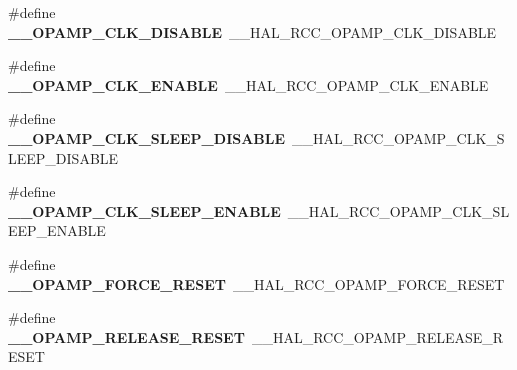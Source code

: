 \begin{DoxyCompactItemize}
\item 
\hypertarget{group___h_a_l___r_c_c___aliased_ga57437cfe118604cf72d55a9f85461322}{\#define {\bfseries \-\_\-\-\_\-\-O\-P\-A\-M\-P\-\_\-\-C\-L\-K\-\_\-\-D\-I\-S\-A\-B\-L\-E}~\-\_\-\-\_\-\-H\-A\-L\-\_\-\-R\-C\-C\-\_\-\-O\-P\-A\-M\-P\-\_\-\-C\-L\-K\-\_\-\-D\-I\-S\-A\-B\-L\-E}\label{group___h_a_l___r_c_c___aliased_ga57437cfe118604cf72d55a9f85461322}

\item 
\hypertarget{group___h_a_l___r_c_c___aliased_ga35ce4b63f0079be9008cdd6466ba22b7}{\#define {\bfseries \-\_\-\-\_\-\-O\-P\-A\-M\-P\-\_\-\-C\-L\-K\-\_\-\-E\-N\-A\-B\-L\-E}~\-\_\-\-\_\-\-H\-A\-L\-\_\-\-R\-C\-C\-\_\-\-O\-P\-A\-M\-P\-\_\-\-C\-L\-K\-\_\-\-E\-N\-A\-B\-L\-E}\label{group___h_a_l___r_c_c___aliased_ga35ce4b63f0079be9008cdd6466ba22b7}

\item 
\hypertarget{group___h_a_l___r_c_c___aliased_gad7e06b8ade3d2d9956bf8ec61b5df71f}{\#define {\bfseries \-\_\-\-\_\-\-O\-P\-A\-M\-P\-\_\-\-C\-L\-K\-\_\-\-S\-L\-E\-E\-P\-\_\-\-D\-I\-S\-A\-B\-L\-E}~\-\_\-\-\_\-\-H\-A\-L\-\_\-\-R\-C\-C\-\_\-\-O\-P\-A\-M\-P\-\_\-\-C\-L\-K\-\_\-\-S\-L\-E\-E\-P\-\_\-\-D\-I\-S\-A\-B\-L\-E}\label{group___h_a_l___r_c_c___aliased_gad7e06b8ade3d2d9956bf8ec61b5df71f}

\item 
\hypertarget{group___h_a_l___r_c_c___aliased_ga6525dcd963caaf31be5ae47cb6c548d4}{\#define {\bfseries \-\_\-\-\_\-\-O\-P\-A\-M\-P\-\_\-\-C\-L\-K\-\_\-\-S\-L\-E\-E\-P\-\_\-\-E\-N\-A\-B\-L\-E}~\-\_\-\-\_\-\-H\-A\-L\-\_\-\-R\-C\-C\-\_\-\-O\-P\-A\-M\-P\-\_\-\-C\-L\-K\-\_\-\-S\-L\-E\-E\-P\-\_\-\-E\-N\-A\-B\-L\-E}\label{group___h_a_l___r_c_c___aliased_ga6525dcd963caaf31be5ae47cb6c548d4}

\item 
\hypertarget{group___h_a_l___r_c_c___aliased_gac393453e90d645ba3ebf635611fe7a9b}{\#define {\bfseries \-\_\-\-\_\-\-O\-P\-A\-M\-P\-\_\-\-F\-O\-R\-C\-E\-\_\-\-R\-E\-S\-E\-T}~\-\_\-\-\_\-\-H\-A\-L\-\_\-\-R\-C\-C\-\_\-\-O\-P\-A\-M\-P\-\_\-\-F\-O\-R\-C\-E\-\_\-\-R\-E\-S\-E\-T}\label{group___h_a_l___r_c_c___aliased_gac393453e90d645ba3ebf635611fe7a9b}

\item 
\hypertarget{group___h_a_l___r_c_c___aliased_ga0730e1df8bbed2f4b2174739fdb629ba}{\#define {\bfseries \-\_\-\-\_\-\-O\-P\-A\-M\-P\-\_\-\-R\-E\-L\-E\-A\-S\-E\-\_\-\-R\-E\-S\-E\-T}~\-\_\-\-\_\-\-H\-A\-L\-\_\-\-R\-C\-C\-\_\-\-O\-P\-A\-M\-P\-\_\-\-R\-E\-L\-E\-A\-S\-E\-\_\-\-R\-E\-S\-E\-T}\label{group___h_a_l___r_c_c___aliased_ga0730e1df8bbed2f4b2174739fdb629ba}


\end{DoxyCompactItemize}
